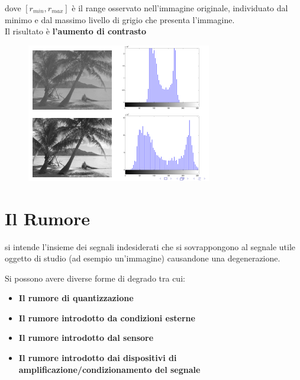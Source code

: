 dove $[r_{min}, r_{max} ]$ è il range osservato nell'immagine originale,
individuato dal minimo e dal massimo livello di grigio che presenta l'immagine.
\\Il risultato è \textbf{l'aumento di contrasto}

\begin{figure}[H]
    \centering
    \includegraphics[width=\linewidth, keepaspectratio]{capitoli/immagini/imgs/stretch-isto.png}
\end{figure}

\section{Il Rumore}

\begin{definition}
    si intende l'insieme dei segnali indesiderati che si sovrappongono al
    segnale utile oggetto di studio (ad esempio un'immagine) causandone una
    degenerazione.
\end{definition}

Si possono avere diverse forme di degrado tra cui:
\begin{itemize}
    \item \textbf{Il rumore di quantizzazione}
    \item \textbf{Il rumore introdotto da condizioni esterne}
    \item \textbf{Il rumore introdotto dal sensore}
    \item \textbf{Il rumore introdotto dai dispositivi di
              amplificazione/condizionamento del segnale}
\end{itemize}

